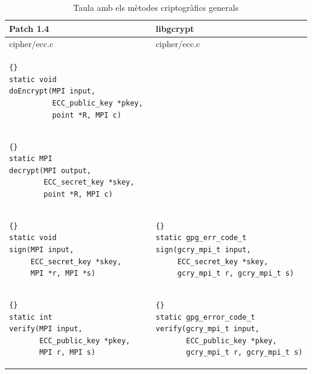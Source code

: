 \documentclass[12pt,twoside,catalan,a4paper]{book}%
\numberwithin{figure}{section}		%
\theoremstyle{definition}   			%
\theoremstyle{saltolinea}   			%
\begin{document}
\begin{table}
\begin{center}
\begin{tabular}{|l|l|}
\hline
Patch 1.4 & libgcrypt \\
\hline
 {\sf cipher/ecc.c}     & {\sf cipher/ecc.c} \\
\hline
 {\tt \begin{lstlisting}{}
static void
doEncrypt(MPI input, 
          ECC_public_key *pkey, 
          point *R, MPI c)
      \end{lstlisting} }
 & \\
\hline
 {\tt \begin{lstlisting}{}
static MPI
decrypt(MPI output,
        ECC_secret_key *skey,
        point *R, MPI c)
      \end{lstlisting} }
 & \\
\hline
 {\tt \begin{lstlisting}{}
static void
sign(MPI input,
     ECC_secret_key *skey,
     MPI *r, MPI *s)
      \end{lstlisting} }
 &
 {\tt \begin{lstlisting}{}
static gpg_err_code_t
sign(gcry_mpi_t input,
     ECC_secret_key *skey,
     gcry_mpi_t r, gcry_mpi_t s)
      \end{lstlisting} } \\
\hline
 {\tt \begin{lstlisting}{}
static int
verify(MPI input,
       ECC_public_key *pkey,
       MPI r, MPI s)
      \end{lstlisting} }
 &
 {\tt \begin{lstlisting}{}
static gpg_error_code_t
verify(gcry_mpi_t input,
       ECC_public_key *pkey,
       gcry_mpi_t r, gcry_mpi_t s)
      \end{lstlisting} } \\
\hline
\end{tabular}
\end{center}
\caption{Taula amb els m\`etodes criptogr\`afics generals \label{tab:cryptGeneral}}
\end{table}
\end{document}
